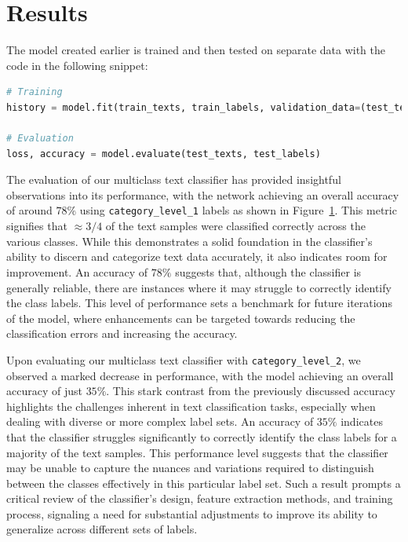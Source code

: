 \section{Results}
The model created earlier is trained and then tested on separate data with the code in the following snippet:
\begin{lstlisting}[language=Python]
# Training
history = model.fit(train_texts, train_labels, validation_data=(test_texts, test_labels), epochs=epochs, batch_size=batch_size, use_multiprocessing=True)

# Evaluation
loss, accuracy = model.evaluate(test_texts, test_labels)
\end{lstlisting}

The evaluation of our multiclass text classifier has provided insightful observations into its performance, with the network achieving an overall accuracy of around $78\%$ using \verb|category_level_1| labels as shown in Figure~\ref{}.
This metric signifies that $\approx 3/4$ of the text samples were classified correctly across the various classes.
While this demonstrates a solid foundation in the classifier's ability to discern and categorize text data accurately, it also indicates room for improvement.
An accuracy of $78\%$ suggests that, although the classifier is generally reliable, there are instances where it may struggle to correctly identify the class labels.
This level of performance sets a benchmark for future iterations of the model, where enhancements can be targeted towards reducing the classification errors and increasing the accuracy.

Upon evaluating our multiclass text classifier with \verb|category_level_2|, we observed a marked decrease in performance, with the model achieving an overall accuracy of just $35\%$. This stark contrast from the previously discussed accuracy highlights the challenges inherent in text classification tasks, especially when dealing with diverse or more complex label sets. An accuracy of $35\%$ indicates that the classifier struggles significantly to correctly identify the class labels for a majority of the text samples. This performance level suggests that the classifier may be unable to capture the nuances and variations required to distinguish between the classes effectively in this particular label set. Such a result prompts a critical review of the classifier’s design, feature extraction methods, and training process, signaling a need for substantial adjustments to improve its ability to generalize across different sets of labels.

